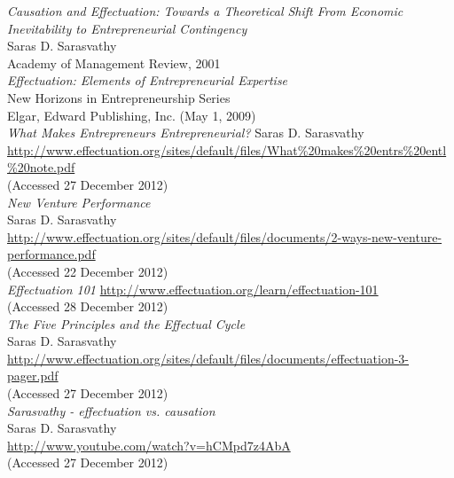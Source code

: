 \documentclass[a4paper,10pt]{article}
\begin{document}
\begin{thebibliography}{9}
  
    
  \emph{Causation and Effectuation: Towards a Theoretical Shift From Economic Inevitability to Entrepreneurial Contingency}\\
  Saras D. Sarasvathy\\
  Academy of Management Review, 2001\\

  \emph{Effectuation: Elements of Entrepreneurial Expertise}\\
   New Horizons in Entrepreneurship Series\\
   Elgar, Edward Publishing, Inc. (May 1, 2009)\\

  \emph{What Makes Entrepreneurs Entrepreneurial?} 
  Saras D. Sarasvathy\\
  \url{http://www.effectuation.org/sites/default/files/What\%20makes\%20entrs\%20entl\%20note.pdf}\\
  (Accessed 27 December 2012)\\
  
  \emph{New Venture Performance}\\
  Saras D. Sarasvathy\\
  \url{http://www.effectuation.org/sites/default/files/documents/2-ways-new-venture-performance.pdf}\\
  (Accessed 22 December 2012)\\
  
  \emph{Effectuation 101}
  \url{http://www.effectuation.org/learn/effectuation-101}\\
  (Accessed 28 December 2012)\\

  \emph{The Five Principles and the Effectual Cycle}\\
  Saras D. Sarasvathy\\
  \url{http://www.effectuation.org/sites/default/files/documents/effectuation-3-pager.pdf}\\
  (Accessed 27 December 2012)\\
  
  \emph{Sarasvathy - effectuation vs. causation}\\
  Saras D. Sarasvathy\\
  \url{http://www.youtube.com/watch?v=hCMpd7z4AbA}\\
  (Accessed 27 December 2012)\\
 

\end{thebibliography}
\end{document}
